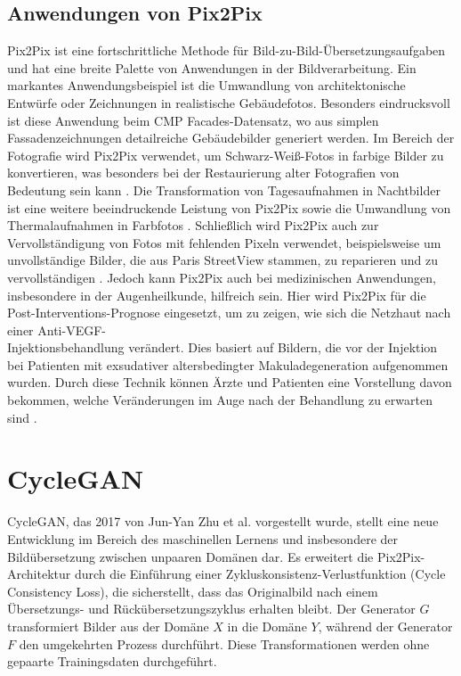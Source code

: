 \subsection{Anwendungen von Pix2Pix}
Pix2Pix ist eine fortschrittliche Methode für Bild-zu-Bild-Übersetzungsaufgaben und hat eine breite Palette von Anwendungen in der Bildverarbeitung.\newline
Ein markantes Anwendungsbeispiel ist die Umwandlung von architektonische Entwürfe oder Zeichnungen in realistische Gebäudefotos. Besonders eindrucksvoll ist diese Anwendung beim CMP Facades-Datensatz, wo aus simplen Fassadenzeichnungen detailreiche Gebäudebilder generiert werden. \cite{PhillipIsola.}
\newline
Im Bereich der Fotografie wird Pix2Pix verwendet, um Schwarz-Weiß-Fotos in farbige Bilder zu konvertieren, was besonders bei der Restaurierung alter Fotografien von Bedeutung sein kann \cite{PhillipIsola.}.
\newline
Die Transformation von Tagesaufnahmen in Nachtbilder ist eine weitere beeindruckende Leistung von Pix2Pix sowie die Umwandlung von Thermalaufnahmen in Farbfotos \cite{PhillipIsola.}.
\newline
Schließlich wird Pix2Pix auch zur Vervollständigung von Fotos mit fehlenden Pixeln verwendet, beispielsweise um unvollständige Bilder, die aus Paris StreetView stammen, zu reparieren und zu vervollständigen \cite{PhillipIsola.}.
\newline
Jedoch kann Pix2Pix auch bei medizinischen Anwendungen, insbesondere in der Augenheilkunde, hilfreich sein. Hier wird Pix2Pix für die Post-Interventions-Prognose eingesetzt, um zu zeigen, wie sich die Netzhaut nach einer Anti-VEGF-\\Injektionsbehandlung verändert. Dies basiert auf Bildern, die vor der Injektion bei Patienten mit exsudativer altersbedingter Makuladegeneration aufgenommen wurden. Durch diese Technik können Ärzte und Patienten eine Vorstellung davon bekommen, welche Veränderungen im Auge nach der Behandlung zu erwarten sind \cite{AramYouJinKukKimIkHeeRyuTaeKeunYoo.2022}.

\section{CycleGAN}
CycleGAN, das 2017 von Jun-Yan Zhu et al. vorgestellt wurde, stellt eine neue Entwicklung im Bereich des maschinellen Lernens und insbesondere der Bildübersetzung zwischen unpaaren Domänen dar. Es erweitert die Pix2Pix-Architektur durch die Einführung einer Zykluskonsistenz-Verlustfunktion (Cycle Consistency Loss), die sicherstellt, dass das Originalbild nach einem Übersetzungs- und Rückübersetzungszyklus erhalten bleibt. Der Generator $G$ transformiert Bilder aus der Domäne $X$ in die Domäne $Y$, während der Generator $F$ den umgekehrten Prozess durchführt. Diese Transformationen werden ohne gepaarte Trainingsdaten durchgeführt.

